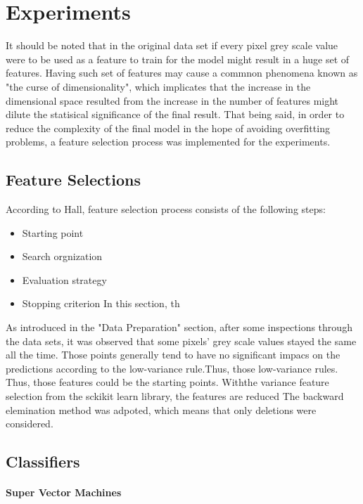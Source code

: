 
\section{Experiments}
\label{sec:expts}
It should be noted that in the original data set if every pixel grey scale value were to be used as a feature to train for the model might result in a huge set of features. Having such set of features may cause a commnon phenomena known as "the curse of dimensionality", which implicates that the increase in the dimensional space resulted from the increase in the number of features might dilute the statisical significance of the final result.\cite{bellman}
That being said, in order to reduce the complexity of the final model in the hope of avoiding overfitting problems, a feature selection process was implemented for the experiments.\cite{hall}
\subsection{Feature Selections}
\label{feature}
According to Hall, feature selection process consists of the following steps:
\begin{itemize}
	\item Starting point
	\item Search orgnization
	\item Evaluation strategy
	\item Stopping criterion
In this section, th
\end{itemize}
As introduced in the "Data Preparation" section, after some inspections through the data sets, it was observed that some pixels' grey scale values stayed the same all the time. Those points generally tend to have no significant impacs on the predictions according to the low-variance rule.Thus, those low-variance rules. Thus, those features could be the starting points. Withthe variance feature selection from the sckikit learn library, the features are reduced 
The backward elemination method was adpoted, which means that only deletions were considered.
\subsection{Classifiers}
\label{class}
\paragraph{Super Vector Machines}

